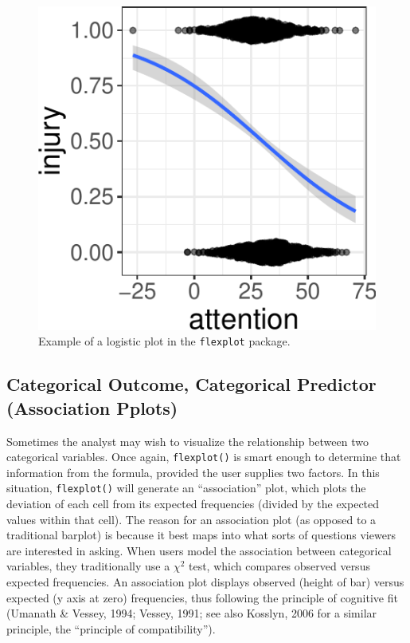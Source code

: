 \documentclass[
  doc]{apa6}
\begin{document}
\begin{figure}
\centering
\includegraphics{flexplot_psychmeth_files/figure-latex/logistic-1.pdf}
\caption{\label{fig:logistic}Example of a logistic plot in the \texttt{flexplot} package.\label{fig:logistic}}
\end{figure}

\hypertarget{categorical-outcome-categorical-predictor-association-pplots}{%
\subsection{Categorical Outcome, Categorical Predictor (Association Pplots)}\label{categorical-outcome-categorical-predictor-association-pplots}}

Sometimes the analyst may wish to visualize the relationship between two categorical variables. Once again, \texttt{flexplot()} is smart enough to determine that information from the formula, provided the user supplies two factors. In this situation, \texttt{flexplot()} will generate an \enquote{association} plot, which plots the deviation of each cell from its expected frequencies (divided by the expected values within that cell). The reason for an association plot (as opposed to a traditional barplot) is because it best maps into what sorts of questions viewers are interested in asking. When users model the association between categorical variables, they traditionally use a \(\chi^2\) test, which compares observed versus expected frequencies. An association plot displays observed (height of bar) versus expected (y axis at zero) frequencies, thus following the principle of cognitive fit (Umanath \& Vessey, 1994; Vessey, 1991; see also Kosslyn, 2006 for a similar principle, the ``principle of compatibility'').
\end{document}
